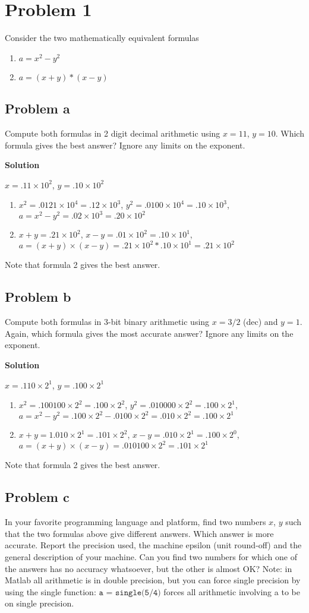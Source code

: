 \documentclass[12pt,oneside,a4paper]{article}
\title{\hmwkTitle}
\author{\hmwkAuthorName}
\date{\today}
\newcommand{\problem}[1]
{
    \clearpage
    \section*{Problem {#1}}
}
\newcommand{\subproblem}[1]
{
    \subsection*{Problem {#1}}
}
\newcommand{\solution}
{
    \vspace{15pt}
    \noindent\ignorespaces\textbf{\large Solution}\par
}
\newcommand{\m}[1]{\texttt{{#1}}}
\begin{document}
\problem{1}
Consider the two mathematically equivalent formulas
\begin{enumerate}
    \item $a = x^2 - y^2$
    \item $a = (x + y) * (x - y)$
\end{enumerate}

\subproblem{a}
Compute both formulas in 2 digit decimal arithmetic using $x = 11$, $y = 10$. Which formula gives the best answer? Ignore any limits on the exponent.

\solution
$x = .11\times 10^2$, $y = .10\times 10^2$
\begin{enumerate}
    \item $x ^ 2 = .0121 \times 10^4 = .12 \times 10^3$, $y^2 = .0100 \times 10^4 = .10 \times 10^3$, \\
    $a = x^2 - y^2 = .02 \times 10^3 = .20 \times 10^2$ 
    \item $x + y = .21 \times 10^2$, $x - y = .01 \times 10^2 = .10 \times 10^1$, \\
    $a = (x+y)\times(x-y) = .21 \times 10^2 * .10 \times 10^1 = .21 \times 10^2$
\end{enumerate}
Note that formula 2 gives the best answer.

\subproblem{b}
Compute both formulas in 3-bit binary arithmetic using $x = 3/2$ (dec) and $y = 1$. Again, which formula gives the most accurate answer? Ignore any limits on the exponent.

\solution
$x = .110 \times 2^1$, $y = .100 \times 2^1$
\begin{enumerate}
    \item $x^2 = .100100 \times 2^2 = .100 \times 2^2$, $y^2 = .010000 \times 2^2 = .100 \times 2^1$, \\
    $a = x^2 - y^2 = .100 \times 2^2 - .0100 \times 2^2 = .010 \times 2^2 = .100 \times 2^1$
    \item $x + y = 1.010 \times 2^1 = .101 \times 2^2$, $x - y = .010 \times 2^1 = .100 \times 2^0$, \\
    $a = (x + y) \times (x - y) = .010100 \times 2^2 = .101 \times 2^1$
\end{enumerate}
Note that formula 2 gives the best answer.

\subproblem{c}
In your favorite programming language and platform, find two numbers $x$, $y$ such that the two formulas above give different answers. Which answer is more accurate. Report the precision used, the machine epsilon (unit round-off) and the general description of your machine. Can you find two numbers for which one of the answers has no accuracy whatsoever, but the other is almost OK? Note: in Matlab all arithmetic is in double precision, but you can force single precision by using the single function: $\m{a = single(5/4)}$ forces all arithmetic involving a to be on single precision.
\end{document}
